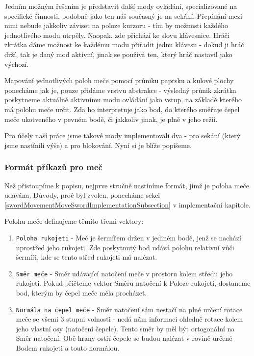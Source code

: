 Jedním možným řešením je představit další mody ovládání, specializované na specifické činnosti, podobně jako ten náš současný je na sekání. Přepínání mezi nimi nebude jakkoliv záviset na poloze kurzoru - tím by možnosti každého jednotlivého modu utrpěly. Naopak, zde přichází ke slovu klávesnice. Hráči zkrátka dáme možnost ke každému modu přiřadit jednu klávesu - dokud ji hráč drží, tak je daný mod aktivní, jinak se používá ten, který hráč nastavil jako výchozí.

Mapování jednotlivých poloh meče pomocí průniku paprsku a kulové plochy ponecháme jak je, pouze přidáme vrstvu abstrakce - výsledný průnik zkrátka poskytneme aktuálně aktivnímu modu ovládání jako vstup, na základě kterého má polohu meče určit. Zda ho interpretuje jako bod, do kterého směřuje čepel meče ukotveného v pevném bodě, či jakkoliv jinak, je plně v jeho režii.

Pro účely naší práce jsme takové mody implementovali dva - pro sekání (který jsme nastínili výše) a pro blokování. Nyní si je blíže popíšeme.

\subsubsection*{Formát příkazů pro meč}

Než přistoupíme k popisu, nejprve stručně nastíníme formát, jímž je poloha meče udávána. Důvody, proč byl zvolen, ponecháme sekci \ref{swordMovementMoveSwordImplementationSubsection} v implementační kapitole.

Polohu meče definujeme těmito třemi vektory:

\pagebreak

\begin{enumerate}
    \item \texttt{Poloha rukojeti} - Meč je šermířem držen v jediném bodě, jenž se nachází uprostřed jeho rukojeti. Zde poskytnutý bod udává polohu relativní vůči šermíři, kde se tento střed rukojeti má nalézat.
    \item \texttt{Směr meče} - Směr udávající natočení meče v prostoru kolem středu jeho rukojeti. Pokud přičteme vektor Směru natočení k Poloze rukojeti, dostaneme bod, kterým by čepel meče měla procházet.
    \item \texttt{Normála na čepel meče} - Směr natočení sám nestačí na plné určení rotace meče se všemi 3 stupni volnosti - nedá nám informaci ohledně rotace kolem jeho vlastní osy (natočení čepele). Tento směr by měl být ortogonální na Směr natočení. Obě hrany ostří čepele se budou nalézat v rovině určené Bodem rukojeti a touto normálou.   
\end{enumerate}

